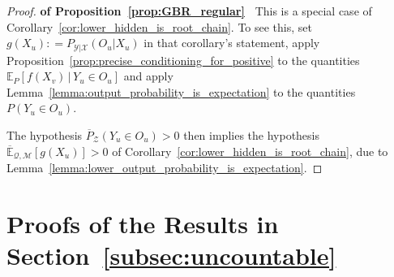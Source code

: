 \documentclass[3p]{elsarticle}
\newcommand{\states}{\mathcal{X}}
\newcommand{\observs}{\mathcal{Y}}
\newcommand{\uexp}{\overline{\mathbb{E}}_{\rateset,\mathcal{M}}}
\newcommand{\rateset}{\mathcal{Q}}
\newcommand{\coloneqq}{:\!=}
\begin{document}
\begin{proof}{\bf of Proposition~\ref{prop:GBR_regular}~}
This is a special case of Corollary~\ref{cor:lower_hidden_is_root_chain}. To see this, set $g(X_u)\coloneqq P_{\observs\vert\states}(O_u\vert X_u)$ in that corollary's statement, apply Proposition~\ref{prop:precise_conditioning_for_positive} to the quantities $\mathbb{E}_P[f(X_v)\,\vert\,Y_u\in O_u]$ and apply Lemma~\ref{lemma:output_probability_is_expectation} to the quantities $P(Y_u\in O_u)$.

The hypothesis $\overline{P}_\mathcal{Z}(Y_u\in O_u)>0$ then implies the hypothesis $\uexp[g(X_u)]>0$ of Corollary~\ref{cor:lower_hidden_is_root_chain}, due to Lemma~\ref{lemma:lower_output_probability_is_expectation}.
\end{proof}

\section{Proofs of the Results in Section~\ref{subsec:uncountable}}
\end{document}
